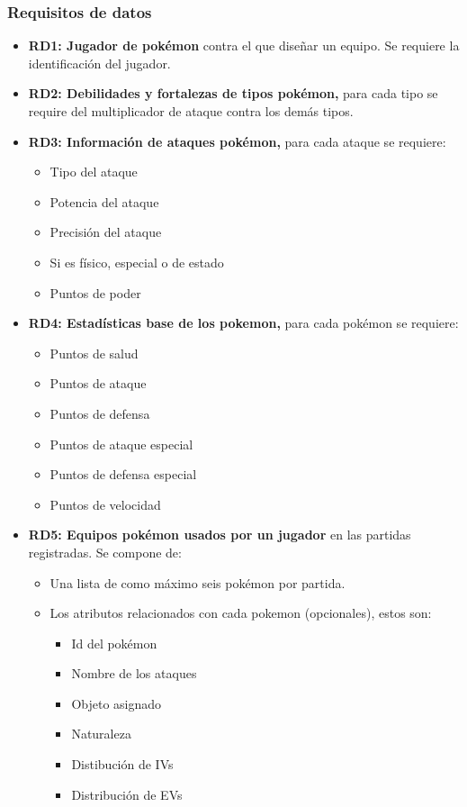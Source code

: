 \subsubsection{Requisitos de datos}

	\begin{itemize}
		\item \textbf{RD1: Jugador de pokémon} contra el que diseñar un equipo. Se
			requiere la identificación del jugador.

		\item \textbf{RD2: Debilidades y fortalezas de tipos pokémon,} para
			cada tipo se require del multiplicador de ataque contra los
			demás tipos.\\

		\item \textbf{RD3: Información de ataques pokémon,} para cada ataque
			se requiere:
			\begin{itemize}
				\item Tipo del ataque
				\item Potencia del ataque
				\item Precisión del ataque
				\item Si es físico, especial o de estado
				\item Puntos de poder
			\end{itemize}

		\item \textbf{RD4: Estadísticas base de los pokemon,} para cada pokémon
			se requiere:
			\begin{itemize}
				\item Puntos de salud
				\item Puntos de ataque
				\item Puntos de defensa
				\item Puntos de ataque especial
				\item Puntos de defensa especial
				\item Puntos de velocidad
			\end{itemize}

		\item \textbf{RD5: Equipos pokémon usados por un jugador} en las partidas
			registradas. Se compone de:
			\begin{itemize}
				\item Una lista de como máximo seis pokémon por partida.
				\item Los atributos relacionados con cada pokemon
					(opcionales), estos son:
					\begin{itemize}
						\item Id del pokémon
						\item Nombre de los ataques
						\item Objeto asignado
						\item Naturaleza
						\item Distibución de IVs
						\item Distribución de EVs
					\end{itemize}
			\end{itemize}


\end{itemize}
